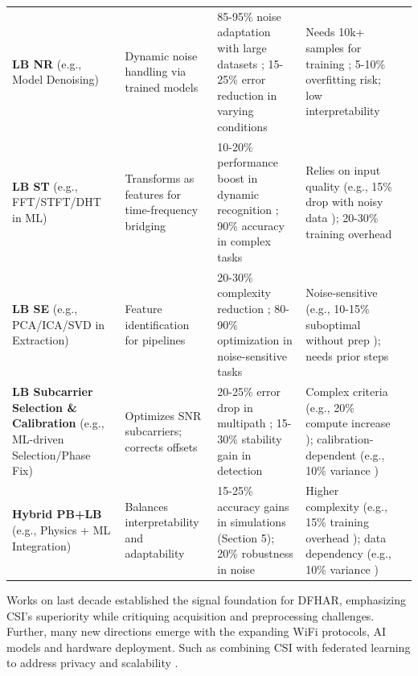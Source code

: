 \documentclass[Afour,sageh,times]{sagej}
\begin{document}
\begin{table}[htbp]
{\begin{tabularx}{\linewidth}{@{} X X X X X @{}}
\rowcolor{lightgray} \textbf{LB NR} (e.g., Model Denoising) & Dynamic noise handling via trained models & 85-95\% noise adaptation with large datasets \citep{yang2022deep}; 15-25\% error reduction in varying conditions \citep{guo2019robust, xie2015precise} & Needs 10k+ samples for training \citep{li2020lidar}; 5-10\% overfitting risk; low interpretability & \citep{guo2019robust, yang2022deep, li2020lidar, xie2015precise}  \\
\textbf{LB ST} (e.g., FFT/STFT/DHT in ML) & Transforms as features for time-frequency bridging & 10-20\% performance boost in dynamic recognition \citep{chen2019dynamic}; 90\% accuracy in complex tasks \citep{ma2019wifi} & Relies on input quality (e.g., 15\% drop with noisy data \citep{ohara2017detecting}); 20-30\% training overhead & \citep{ma2019wifi, ohara2017detecting, chen2019dynamic}  \\
\rowcolor{lightgray} \textbf{LB SE} (e.g., PCA/ICA/SVD in Extraction) & Feature identification for pipelines & 20-30\% complexity reduction \citep{han2020air}; 80-90\% optimization in noise-sensitive tasks \citep{zhang2019wigrus} & Noise-sensitive (e.g., 10-15\% suboptimal without prep \citep{oshiga2019human}); needs prior steps & \citep{oshiga2019human, zhang2019wigrus, han2020air}  \\
\textbf{LB Subcarrier Selection \& Calibration} (e.g., ML-driven Selection/Phase Fix) & Optimizes SNR subcarriers; corrects offsets & 20-25\% error drop in multipath \citep{yang2022deep, xie2015precise}; 15-30\% stability gain in detection \citep{chen2023cross} & Complex criteria (e.g., 20\% compute increase \citep{huang2020towards}); calibration-dependent (e.g., 10\% variance \citep{zeng2021review}) & \citep{chen2023cross, li2019wi, huang2020towards, yang2022deep, li2020lidar, xie2015precise, zeng2021review}  \\

\rowcolor{lightgray} \textbf{Hybrid PB+LB} (e.g., Physics + ML Integration) & Balances interpretability and adaptability & 15-25\% accuracy gains in simulations (Section 5); 20\% robustness in noise \citep{chen2023cross} & Higher complexity (e.g., 15\% training overhead \citep{huang2020towards}); data dependency (e.g., 10\% variance \citep{zeng2021review}) & \citep{yang2022deep, chen2023cross, huang2020towards, zeng2021review} \\
\bottomrule
\end{tabularx}
}
\end{table}
Works on last decade established the signal foundation for DFHAR, emphasizing CSI's superiority while critiquing acquisition and preprocessing challenges. Further, many new directions emerge with the expanding WiFi protocols, AI models and hardware deployment. Such as combining CSI with federated learning to address privacy and scalability \citep{yang2022deep, zhou2022target, guo2019robust}.
\end{document}
